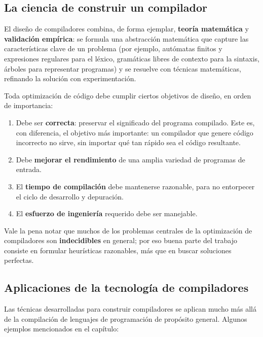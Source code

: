 \documentclass[11pt,a4paper]{article}
\begin{document}
\subsection{La ciencia de construir un compilador}

El diseño de compiladores combina, de forma ejemplar, \textbf{teoría matemática} y
\textbf{validación empírica}: se formula una abstracción matemática que capture las
características clave de un problema (por ejemplo, autómatas finitos y expresiones regulares
para el léxico, gramáticas libres de contexto para la sintaxis, árboles para representar
programas) y se resuelve con técnicas matemáticas, refinando la solución con experimentación.

Toda optimización de código debe cumplir ciertos objetivos de diseño, en orden de importancia:

\begin{enumerate}
    \item Debe ser \textbf{correcta}: preservar el significado del programa compilado. Este es,
    con diferencia, el objetivo más importante: un compilador que genere código incorrecto no
    sirve, sin importar qué tan rápido sea el código resultante.
    \item Debe \textbf{mejorar el rendimiento} de una amplia variedad de programas de entrada.
    \item El \textbf{tiempo de compilación} debe mantenerse razonable, para no entorpecer el
    ciclo de desarrollo y depuración.
    \item El \textbf{esfuerzo de ingeniería} requerido debe ser manejable.
\end{enumerate}

Vale la pena notar que muchos de los problemas centrales de la optimización de compiladores son
\textbf{indecidibles} en general; por eso buena parte del trabajo consiste en formular
heurísticas razonables, más que en buscar soluciones perfectas.

\subsection{Aplicaciones de la tecnología de compiladores}

Las técnicas desarrolladas para construir compiladores se aplican mucho más allá de la
compilación de lenguajes de programación de propósito general. Algunos ejemplos mencionados en
el capítulo:
\end{document}
